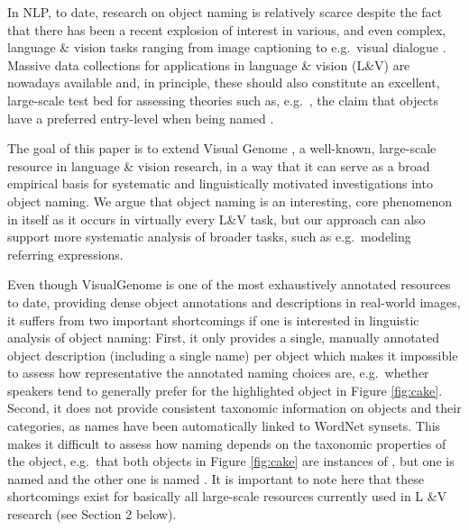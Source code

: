 In NLP, to date, research on object naming is relatively scarce despite the fact that
 there has been a recent explosion of interest in various, and even complex, language \& vision tasks ranging from image captioning \cite{fangetal:2015,devlin:imcaqui,Bernardietal:automatic} to e.g.\ visual dialogue \cite{das2017visual,vries2017guesswhat}. Massive data collections for applications in language \& vision (L\&V) are nowadays available and, in principle, these should also constitute an excellent, large-scale test bed for assessing  theories such as, e.g.\ , the claim that objects have a preferred entry-level when being named  \cite{rosch1976basic}.

The goal of this paper is to extend Visual Genome  \cite{krishna2016visualgenome}, a well-known, large-scale resource in language \& vision research, in a way that it can serve as a broad empirical basis for systematic and linguistically motivated investigations into object naming. 
We argue that object naming is an interesting, core phenomenon in itself as it occurs in virtually every L\&V task, but our approach can also support more systematic analysis of broader tasks, such as e.g.\ modeling referring expressions.

Even though VisualGenome is one of the most exhaustively annotated resources to date, providing dense object annotations and descriptions in real-world images, it suffers from two important shortcomings if one is interested in linguistic analysis of object naming:  
First, it only provides a single, manually annotated object description (including a single name) per object which makes it impossible to assess how representative the annotated naming choices are, e.g.\ whether speakers tend to generally prefer  for the highlighted object in Figure \ref{fig:cake}.
Second, it does not provide consistent taxonomic information on objects and their categories, as names have been automatically linked to WordNet synsets. 
This makes it difficult to assess how naming depends on the taxonomic properties of the object, e.g.\  that both objects in Figure \ref{fig:cake} are instances of , but one is named  and the other one is named . It is important to note here that these shortcomings exist for basically all large-scale resources currently used in L \&V research (see Section 2 below).

